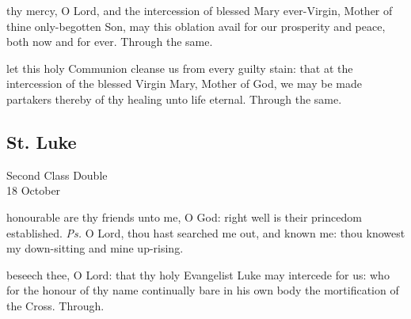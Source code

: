 \secret
{} thy mercy, O Lord, and the intercession of blessed Mary ever-Virgin, Mother of thine only-begotten Son, may this oblation avail for our prosperity and peace, both now and for ever. Through the same.


\vspace{-0.25\baselineskip}

\postcommunion
{} let this holy Communion cleanse us from every guilty stain: that at the intercession of the blessed Virgin Mary, Mother of God, we may be made partakers thereby of thy healing unto life eternal. Through the same.


\subsection{St. Luke}
\begin{inhead}
    {Second Class Double\\
18 October}
\end{inhead}

\vspace{-0.25\baselineskip}

\introit
{} honourable are thy friends unto me, O God: right well is their princedom established. \textit{Ps.} O Lord, thou hast searched me out, and known me: thou knowest my down-sitting and mine up-rising.

\vspace{-0.25\baselineskip}

\collect
 beseech thee, O Lord: that thy holy Evangelist Luke may intercede for us: who for the honour of thy name continually bare in his own body the mortification of the Cross. Through.

